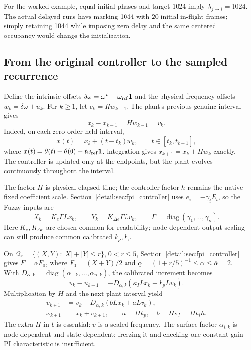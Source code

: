 For the worked example, equal initial phases and target 1024 imply
$\lambda_{j\to i}=1024$. The actual delayed runs have marking 1044 with
20 initial in-flight frames; simply retaining 1044 while imposing zero
delay and the same centered occupancy would change the initialization.

\subsection{From the original controller to the sampled recurrence}

Define the intrinsic offsets $\delta\omega=\omega^u-\omega_{\rm ref}\mathbf1$
and the physical frequency offsets $w_k=\delta\omega+u_k$. For $k\ge1$,
let $v_k=Hw_{k-1}$. The plant's previous genuine interval gives
\begin{equation}
 x_k-x_{k-1}=Hw_{k-1}=v_k.
 \label{detail:eq:btd_d_plant}
\end{equation}
Indeed, on each zero-order-held interval,
\begin{equation}
 x(t)=x_k+(t-t_k)w_k,\qquad t\in[t_k,t_{k+1}],
 \label{detail:eq:btd_exact_continuous_flow}
\end{equation}
where $x(t)=\theta(t)-\theta(0)-t\omega_{\rm ref}\mathbf1$.
Integration gives $x_{k+1}=x_k+Hw_k$ exactly. The controller is updated
only at the endpoints, but the plant evolves continuously throughout
the interval.

The factor $H$ is physical elapsed time; the controller factor $h$ remains
the native fixed coefficient scale. Section~\ref{detail:sec:fpi_controller} uses
$e_i=-\gamma_i E_i$, so the Fuzzy inputs are
\begin{equation}
 X_k=K_e\Gamma Lx_k,\qquad
 Y_k=K_{\Delta e}\Gamma Lv_k,\qquad
 \Gamma=\operatorname{diag}(\gamma_1,\ldots,\gamma_n).
 \label{detail:eq:btd_d_inputs}
\end{equation}
Here $K_e,K_{\Delta e}$ are chosen common for readability; node-dependent
output scaling can still produce common calibrated $k_p,k_i$.

On $\Omega_r=\{(X,Y):|X|+|Y|\le r\}$, $0<r\le5$, Section~\ref{detail:sec:fpi_controller} gives
$F=\alpha F_0$, where $F_0=(X+Y)/2$ and
$\underline\alpha=(1+r/5)^{-1}\le\alpha\le\overline\alpha=2$.
With $D_{\alpha,k}=\operatorname{diag}(\alpha_{1,k},\ldots,\alpha_{n,k})$,
the calibrated increment becomes
\begin{equation}
 u_k-u_{k-1}=-D_{\alpha,k}(\kappa_I Lx_k+k_pLv_k).
 \label{detail:eq:btd_d_command_increment}
\end{equation}
Multiplication by $H$ and the next plant interval yield
\begin{align}
 v_{k+1}&=v_k-D_{\alpha,k}(bLx_k+aLv_k),\nonumber\\
 x_{k+1}&=x_k+v_{k+1},\qquad
 a=Hk_p,\quad b=H\kappa_I=Hk_i h.
 \label{detail:eq:btd_full_recurrence}
\end{align}
The extra $H$ in $b$ is essential: $v$ is a scaled frequency. The surface
factor $\alpha_{i,k}$ is node-dependent and state-dependent; freezing it
and checking one constant-gain PI characteristic is insufficient.

